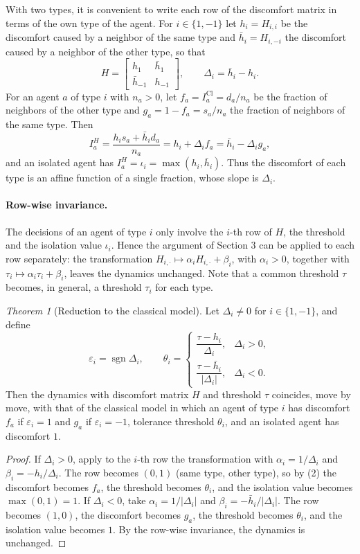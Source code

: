 \documentclass{article}
\theoremstyle{remark}
\newtheorem{theorem}{Theorem}
\begin{document}
With two types, it is convenient to write each row of the discomfort matrix in terms of the own type of the agent. For $i\in\{1,-1\}$ let $h_i=H_{i,i}$ be the discomfort caused by a neighbor of the same type and $\bar h_i=H_{i,-i}$ the discomfort caused by a neighbor of the other type, so that
\[
H=\begin{bmatrix}
h_1 & \bar h_1 \\
\bar h_{-1} & h_{-1}
\end{bmatrix},
\qquad
\Delta_i=\bar h_i-h_i .
\]
For an agent $a$ of type $i$ with $n_a>0$, let $f_a=I_a^{\mathrm{Cl}}=d_a/n_a$ be the fraction of neighbors of the other type and $g_a=1-f_a=s_a/n_a$ the fraction of neighbors of the same type. Then
\[
I_a^H=\frac{h_i s_a+\bar h_i d_a}{n_a}=h_i+\Delta_i f_a=\bar h_i-\Delta_i g_a, \tag{2}
\]
and an isolated agent has $I_a^H=\iota_i=\max(h_i,\bar h_i)$. Thus the discomfort of each type is an affine function of a single fraction, whose slope is $\Delta_i$.

\paragraph{Row-wise invariance.} The decisions of an agent of type $i$ only involve the $i$-th row of $H$, the threshold and the isolation value $\iota_i$. Hence the argument of Section 3 can be applied to each row separately: the transformation $H_{i,\cdot}\mapsto\alpha_i H_{i,\cdot}+\beta_i$, with $\alpha_i>0$, together with $\tau_i\mapsto\alpha_i\tau_i+\beta_i$, leaves the dynamics unchanged. Note that a common threshold $\tau$ becomes, in general, a threshold $\tau_i$ for each type.

\begin{theorem}[Reduction to the classical model]\label{thm:reduction}
Let $\Delta_i\neq 0$ for $i\in\{1,-1\}$, and define
\[
\varepsilon_i=\operatorname{sgn}\Delta_i,\qquad
\theta_i=\begin{cases}
\dfrac{\tau-h_i}{\Delta_i}, & \Delta_i>0,\\[2ex]
\dfrac{\tau-\bar h_i}{|\Delta_i|}, & \Delta_i<0.
\end{cases}
\]
Then the dynamics with discomfort matrix $H$ and threshold $\tau$ coincides, move by move, with that of the classical model in which an agent of type $i$ has discomfort $f_a$ if $\varepsilon_i=1$ and $g_a$ if $\varepsilon_i=-1$, tolerance threshold $\theta_i$, and an isolated agent has discomfort $1$.
\end{theorem}

\begin{proof}
If $\Delta_i>0$, apply to the $i$-th row the transformation with $\alpha_i=1/\Delta_i$ and $\beta_i=-h_i/\Delta_i$. The row becomes $(0,1)$ (same type, other type), so by (2) the discomfort becomes $f_a$, the threshold becomes $\theta_i$, and the isolation value becomes $\max(0,1)=1$. If $\Delta_i<0$, take $\alpha_i=1/|\Delta_i|$ and $\beta_i=-\bar h_i/|\Delta_i|$. The row becomes $(1,0)$, the discomfort becomes $g_a$, the threshold becomes $\theta_i$, and the isolation value becomes $1$. By the row-wise invariance, the dynamics is unchanged.
\end{proof}
\end{document}
